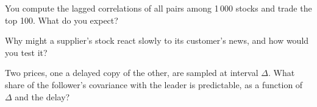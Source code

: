 \begin{interviewq}\label{iq:rs:cross-sectional-and-cross-asset-features:4}
You compute the lagged correlations of all pairs among 1\,000 stocks and trade the top 100. What do you expect?
\end{interviewq}

\begin{interviewq}\label{iq:rs:cross-sectional-and-cross-asset-features:5}
Why might a supplier's stock react slowly to its customer's news, and how would you test it?
\end{interviewq}

\begin{interviewq}\label{iq:rs:cross-sectional-and-cross-asset-features:6}
Two prices, one a delayed copy of the other, are sampled at interval $\Delta$. What share of the follower's covariance with the leader
is predictable, as a function of $\Delta$ and the delay?
\end{interviewq}
